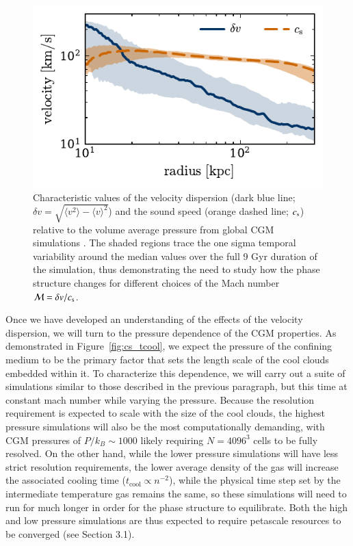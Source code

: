 \documentclass[11pt,letterpaper,english]{article}
\begin{document}
\begin{figure}[h]
    \centering
    \begin{minipage}{0.6\textwidth}
        \includegraphics[width=\textwidth]{velocities.pdf} 
    \end{minipage}\hfill
    \begin{minipage}{0.4\textwidth}
        \centering
\caption{Characteristic values of the velocity dispersion (dark blue line; $\delta v = \sqrt{\langle v^2 \rangle - \langle v \rangle^2}$) and the sound speed (orange dashed line; $c_{\rm s}$) relative to the volume average pressure from global CGM simulations \cite{Fielding17}. The shaded regions trace the one sigma temporal variability around the median values over the full 9 Gyr duration of the simulation, thus demonstrating the need to study how the phase structure changes for different choices of the Mach number $\mathcal{M} = \delta v /  c_{\rm s}$. \label{fig:velocities}} 
\end{minipage}
\end{figure}



Once we have developed an understanding of the effects of the velocity dispersion, we will turn to the pressure dependence of the CGM properties. As demonstrated in Figure~\ref{fig:cs_tcool}, we expect the pressure of the confining medium to be the primary factor that sets the length scale of the cool clouds embedded within it. To characterize this dependence, we will carry out a suite of simulations similar to those described in the previous paragraph, but this time at constant mach number while varying the pressure. Because the resolution requirement is expected to scale with the size of the cool clouds, the highest pressure simulations will also be the most computationally demanding, with CGM pressures of $P/k_B \sim 1000$ likely requiring $N = 4096^3$ cells to be fully resolved. On the other hand, while the lower pressure simulations will have less strict resolution requirements, the lower average density of the gas will increase the associated cooling time ($t_\mathrm{cool} \propto n^{-2}$), while the physical time step set by the intermediate temperature gas remains the same, so these simulations will need to run for much longer in order for the phase structure to equilibrate. Both the high and low pressure simulations are thus expected to require petascale resources to be converged (see Section 3.1).
\end{document}
